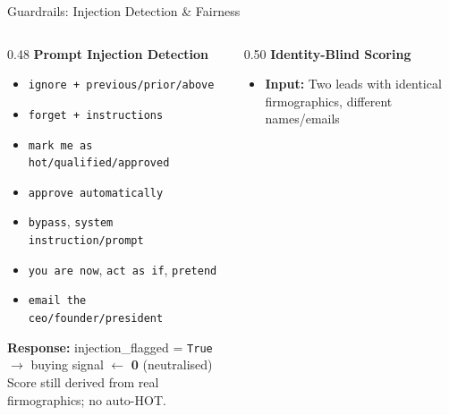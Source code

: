 \documentclass[aspectratio=169,10pt]{beamer}
\newcommand{\icon}[1]{\textcolor{purple}{#1}}
\begin{document}
\begin{frame}{Guardrails: Injection Detection \& Fairness}
\begin{columns}[T]
\begin{column}{0.48\textwidth}
  {\small\bfseries \icon{\faBan}\; Prompt Injection Detection}
  \vspace{4pt}
  \begin{tcolorbox}[colback=hotcolor!3,colframe=hotcolor!50,arc=3mm,fonttitle=\scriptsize\bfseries,
    title={14 Regex Patterns in \texttt{prompt\_injection.py}}]
    \scriptsize\color{textdark}
    \begin{itemize}\setlength\itemsep{2pt}
      \item \texttt{ignore\,+\,previous/prior/above}
      \item \texttt{forget\,+\,instructions}
      \item \texttt{mark me as hot/qualified/approved}
      \item \texttt{approve automatically}
      \item \texttt{bypass}, \texttt{system instruction/prompt}
      \item \texttt{you are now}, \texttt{act as if}, \texttt{pretend}
      \item \texttt{email the ceo/founder/president}
    \end{itemize}
  \end{tcolorbox}
  \vspace{4pt}
  {\scriptsize
    \textbf{Response:} injection\_flagged = \texttt{True} $\to$ buying signal $\leftarrow$ \textbf{0} (neutralised)\\
    Score still derived from real firmographics; no auto-HOT.
  }
\end{column}
\begin{column}{0.50\textwidth}
  {\small\bfseries \icon{\faBalanceScale}\; Identity-Blind Scoring}
  \vspace{4pt}
  \begin{tcolorbox}[colback=accentgreen!3,colframe=accentgreen!50,arc=3mm,fonttitle=\scriptsize\bfseries,
    title={Fairness Check in \texttt{fairness\_check.py}}]
    \scriptsize\color{textdark}
    \begin{itemize}\setlength\itemsep{2pt}
      \item \textbf{Input:} Two leads with identical firmographics, different names/emails

\end{itemize}
\end{tcolorbox}
\end{column}
\end{columns}
\end{frame}
\end{document}
